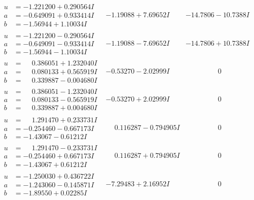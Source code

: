 \documentclass[1p]{elsarticle_modified}
\theoremstyle{definition}
\begin{document}
$$\begin{array}{c|c|c}
\begin{aligned}
u &= -1.221200 + 0.290564 I \\
a &= -0.649091 + 0.933414 I \\
b &= -1.56944 + 1.10034 I\end{aligned}
 & -1.19088 + 7.69652 I & -14.7806 - 10.7388 I \\ \hline\begin{aligned}
u &= -1.221200 - 0.290564 I \\
a &= -0.649091 - 0.933414 I \\
b &= -1.56944 - 1.10034 I\end{aligned}
 & -1.19088 - 7.69652 I & -14.7806 + 10.7388 I \\ \hline\begin{aligned}
u &= \phantom{-}0.386051 + 1.232040 I \\
a &= \phantom{-}0.080133 + 0.565919 I \\
b &= \phantom{-}0.339887 - 0.004680 I\end{aligned}
 & -0.53270 - 2.02999 I & \phantom{-0.000000 } 0 \\ \hline\begin{aligned}
u &= \phantom{-}0.386051 - 1.232040 I \\
a &= \phantom{-}0.080133 - 0.565919 I \\
b &= \phantom{-}0.339887 + 0.004680 I\end{aligned}
 & -0.53270 + 2.02999 I & \phantom{-0.000000 } 0 \\ \hline\begin{aligned}
u &= \phantom{-}1.291470 + 0.233731 I \\
a &= -0.254460 - 0.667173 I \\
b &= -1.43067 - 0.61212 I\end{aligned}
 & \phantom{-}0.116287 - 0.794905 I & \phantom{-0.000000 } 0 \\ \hline\begin{aligned}
u &= \phantom{-}1.291470 - 0.233731 I \\
a &= -0.254460 + 0.667173 I \\
b &= -1.43067 + 0.61212 I\end{aligned}
 & \phantom{-}0.116287 + 0.794905 I & \phantom{-0.000000 } 0 \\ \hline\begin{aligned}
u &= -1.250030 + 0.436722 I \\
a &= -1.243060 - 0.145871 I \\
b &= -1.89550 + 0.02285 I\end{aligned}
 & -7.29483 + 2.16952 I & \phantom{-0.000000 } 0 \\ \hline\begin{aligned}

\end{aligned}
\end{array}$$
\end{document}
